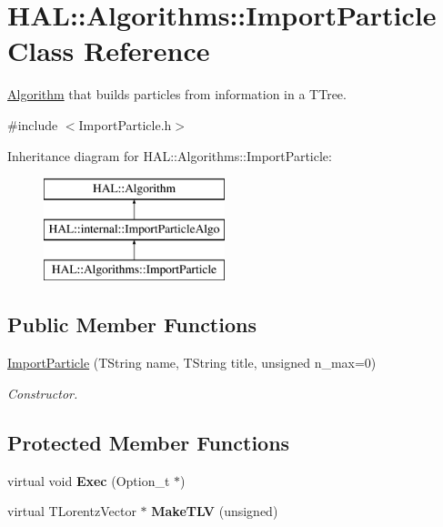 \hypertarget{class_h_a_l_1_1_algorithms_1_1_import_particle}{\section{H\+A\+L\+:\+:Algorithms\+:\+:Import\+Particle Class Reference}
\label{class_h_a_l_1_1_algorithms_1_1_import_particle}
}


\hyperlink{class_h_a_l_1_1_algorithm}{Algorithm} that builds particles from information in a T\+Tree.  




{\ttfamily \#include $<$Import\+Particle.\+h$>$}

Inheritance diagram for H\+A\+L\+:\+:Algorithms\+:\+:Import\+Particle\+:\begin{figure}[H]
\begin{center}
\leavevmode
\includegraphics[height=3.000000cm]{class_h_a_l_1_1_algorithms_1_1_import_particle}
\end{center}
\end{figure}
\subsection*{Public Member Functions}
\begin{DoxyCompactItemize}
\item 
\hyperlink{class_h_a_l_1_1_algorithms_1_1_import_particle_ab42dcac49ed8ae1f565346ec7372c7a5}{Import\+Particle} (T\+String name, T\+String title, unsigned n\+\_\+max=0)
\begin{DoxyCompactList}\small\item\em Constructor. \end{DoxyCompactList}\end{DoxyCompactItemize}
\subsection*{Protected Member Functions}
\begin{DoxyCompactItemize}
\item 
\hypertarget{class_h_a_l_1_1_algorithms_1_1_import_particle_a1e5924b9deb6c7d1c1d1734b8cb510cb}{virtual void {\bfseries Exec} (Option\+\_\+t $\ast$)}\label{class_h_a_l_1_1_algorithms_1_1_import_particle_a1e5924b9deb6c7d1c1d1734b8cb510cb}

\item 
\hypertarget{class_h_a_l_1_1_algorithms_1_1_import_particle_abad1a5a9b44becfae4e4a7113edc80eb}{virtual T\+Lorentz\+Vector $\ast$ {\bfseries Make\+T\+L\+V} (unsigned)}\label{class_h_a_l_1_1_algorithms_1_1_import_particle_abad1a5a9b44becfae4e4a7113edc80eb}

\end{DoxyCompactItemize}


